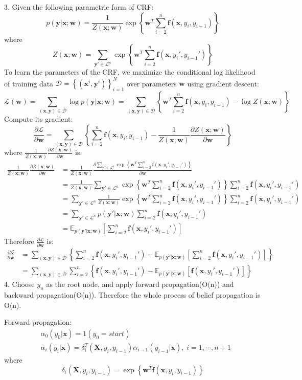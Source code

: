 \documentclass[12pt]{article}
\begin{document}
3. Given the following parametric form of CRF:
$$p(\bm{y}|\bm{x};\bm{w})=\frac{1}{Z(\bm{x};\bm{w})}\exp\left\{\bm{w}^T\sum_{i=2}^n\bm{f}(\bm{x},y_i,y_{i-1})\right\}$$
where 
$$Z(\bm{x};\bm{w})=\sum_{\bm{y}'\in\mathcal{L}^n}\exp\left\{\bm{w}^T\sum_{i=2}^n\bm{f}(\bm{x},y_i',y_{i-1}')\right\}$$
To learn the parameters of the CRF, we maximize the conditional log
likelihood of training data $\mathcal{D} =\left\{(\bm{x}^i,\bm{y}^i)\right\}_{i=1}^N$ over parameters $\bm{w}$ using gradient descent:
$$\mathcal{L}(\bm{w})=\sum_{(\bm{x},\bm{y})\in\mathcal{D}}\log p(\bm{y}|\bm{x};\bm{w})=\sum_{(\bm{x},\bm{y})\in\mathcal{D}}\left\{\bm{w}^T\sum_{i=2}^n\bm{f}(\bm{x},y_i,y_{i-1})-\log Z(\bm{x};\bm{w}) \right\}$$
Compute its gradient:
$$\frac{\partial\mathcal{L}}{\partial\bm{w}}=\sum_{(\bm{x},\bm{y})\in\mathcal{D}}\left\{\sum_{i=2}^n\bm{f}(\bm{x},y_i,y_{i-1})-\frac{1}{Z(\bm{x};\bm{w})}\frac{\partial Z(\bm{x};\bm{w})}{\partial\bm{w}}\right\}$$
where $\frac{1}{Z(\bm{x};\bm{w})}\frac{\partial Z(\bm{x};\bm{w})}{\partial\bm{w}}$ is:
\begin{align*}
\frac{1}{Z(\bm{x};\bm{w})}\frac{\partial Z(\bm{x};\bm{w})}{\partial\bm{w}}&=\frac{1}{Z(\bm{x};\bm{w})}\frac{\partial\sum_{\bm{y}'\in\mathcal{L}^n}\exp\left\{\bm{w}^T\sum_{i=2}^n\bm{f}(\bm{x},y_i',y_{i-1}')\right\}}{\partial\bm{w}}\\
&=\frac{1}{Z(\bm{x};\bm{w})}\sum_{\bm{y}'\in\mathcal{L}^n}\exp\left\{\bm{w}^T\sum_{i=2}^n\bm{f}(\bm{x},y_i',y_{i-1}')\right\}\sum_{i=2}^n\bm{f}(\bm{x},y_i',y_{i-1}')\\
&=\sum_{\bm{y}'\in\mathcal{L}^n}\frac{1}{Z(\bm{x};\bm{w})}\exp\left\{\bm{w}^T\sum_{i=2}^n\bm{f}(\bm{x},y_i',y_{i-1}')\right\}\sum_{i=2}^n\bm{f}(\bm{x},y_i',y_{i-1}')\\
&=\sum_{\bm{y}'\in\mathcal{L}^n}p(\bm{y}'|\bm{x};\bm{w})\sum_{i=2}^n\bm{f}(\bm{x},y_i',y_{i-1}')\\
&=\mathbb{E}_{p(\bm{y}'|\bm{x};\bm{w})}\left[\sum_{i=2}^n\bm{f}(\bm{x},y_i',y_{i-1}')\right]
\end{align*}
Therefore $\frac{\partial\mathcal{L}}{\partial\bm{w}}$ is:
\begin{align*}
\frac{\partial\mathcal{L}}{\partial\bm{w}}&=\sum_{(\bm{x},\bm{y})\in\mathcal{D}}\left\{\sum_{i=2}^n\bm{f}(\bm{x},y_i',y_{i-1}')-\mathbb{E}_{p(\bm{y}'|\bm{x};\bm{w})}\left[\sum_{i=2}^n\bm{f}(\bm{x},y_i',y_{i-1}')\right]\right\}\\
&=\sum_{(\bm{x},\bm{y})\in\mathcal{D}}\sum_{i=2}^n\left\{\bm{f}(\bm{x},y_i',y_{i-1}')-\mathbb{E}_{p(\bm{y}'|\bm{x};\bm{w})}\left[\bm{f}(\bm{x},y_i',y_{i-1}')\right]\right\}
\end{align*}
4. Choose $y_n$ as the root node, and apply forward propagation(O(n)) and backward propagation(O(n)). Therefore the whole process of belief propagation is O(n).
\par
Forward propagation:
\begin{align*}
&\alpha_0(y_0|\bm{x})=1(y_0 = start)\\
&\alpha_i(y_i|\bm{x})=\delta_i^T(\bm{X},y_i,y_{i-1})\alpha_{i-1}(y_{i-1}|\bm{x}),\;i=1,\cdots,n+1
\end{align*}
where
$$\delta_i(\bm{X},y_i,y_{i-1})=\exp\left\{\bm{w}^T\bm{f}(\bm{x},y_i,y_{i-1})\right\}$$
\end{document}
